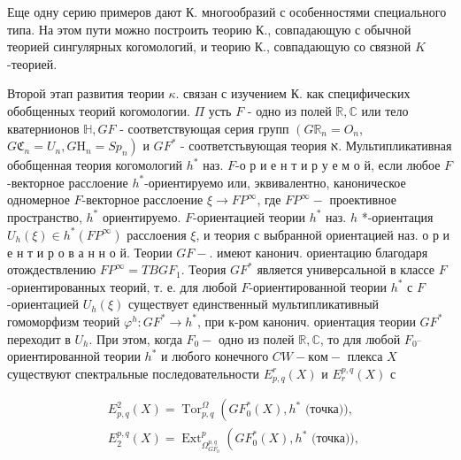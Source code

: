 \documentclass[10pt]{article}
\begin{document}
Еще одну серию примеров дают $К$. многообразий с особенностями специального типа. На этом пути можно построить теорию К., совпадающую с обычной теорией сингулярных когомологий, и теорию К., совпадающую со связной $K$-теорией.



Второй этап развития теории $\kappa$. связан с изучением К. как специфических обобщенных теорий когомологии. $\Pi$ усть $F$ - одно из полей $\mathbb{R}, \mathbb{C}$ или тело кватернионов $\mathbb{H}, G F$ - соответствующая серия групп $\left(G \mathbb{R}_{n}=O_{n}\right.$, $\left.G \mathfrak{C}_{n}=U_{n}, G \mathrm{H}_{n}=S p_{n}\right)$ и $G F^{*}$ - соответстьвующая теория א. Мультипликативная обобщенная теория когомологий $h^{*}$ наз. $F$-о р и е н т и р у е м о й, если любое $F$-векторное расслоение $h^{*}$-ориентируемо или, эквивалентно, каноническое одномерное $F$-векторное расслоение $\xi \rightarrow F P^{\infty}$, где $F P^{\infty}-$ проективное пространство, $h^{*}$ ориентируемо. $F$-ориентацией теории $h^{*}$ наз. $h$ *-ориентация $U_{h}(\xi) \in h^{*}\left(F P^{\infty}\right)$ расслоения $\xi$, и теория с выбранной ориентацией наз. о р и е н т и р о в а н н о й. Теории $G F-$. имеют канонич. ориентацию благодаря отождествлению $F P^{\infty}=T B G F_{1}$. Теория $G F^{*}$ является универсальной в классе $F$-ориентированных теорий, т. е. для любой $F$-ориентированной теории $h^{*}$ с $F$-ориентацией $U_{h}(\xi)$ существует единственный мультипликативный гомоморфизм теорий $\varphi^{h}: G F^{*} \rightarrow h^{*}$, при к-ром канонич. ориентация теории $G F^{*}$ переходит в $U_{h}$. При этом, когда $F_{0}-$ одно из полей $\mathbb{R}, \mathbb{C}$, то для любой $F_{0^{-}}$ ориентированной теории $h^{*}$ и любого конечного $C W-к о м-$ плекса $X$ существуют спектральные последовательности $E_{p, q}^{r}(X)$ и $E_{r}^{p, q}(X)$ с



\[

\begin{aligned}

& E_{p, q}^{2}(X)=\operatorname{Tor}_{p, q}^{\Omega}\left(G F_{0}^{*}(X), h^{*}\right. \text { (точка)), } \\

& E_{2}^{p, q}(X)=\operatorname{Ext}_{\Omega_{G F_{0}}^{p, q}}^{p}\left(G F_{0}^{*}(X), h^{*}\right. \text { (точка)), }

\end{aligned}

\]
\end{document}
